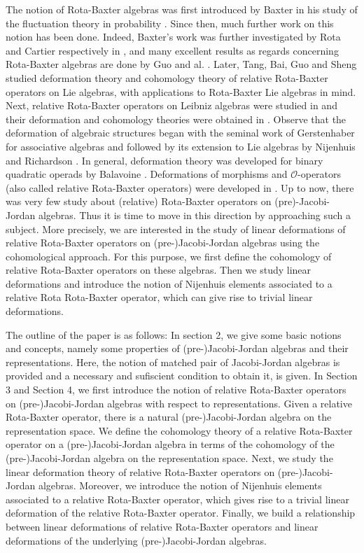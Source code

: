 \documentclass[12pt]{amsart}
\begin{document}
		The notion of Rota-Baxter algebras was first introduced by Baxter in his study of the fluctuation theory in
	probability \cite{gb}. Since then, much further work on this notion has been done. Indeed, Baxter's work was further investigated by Rota and Cartier respectively in \cite{gcr},\cite{pc} and many excellent results as regards concerning Rota-Baxter algebras are done by Guo
	and al. \cite{lg,lgwk,lgwk1}. Later, Tang, Bai, Guo and Sheng \cite{tbgs} studied deformation theory and cohomology theory of relative Rota-Baxter operators on Lie algebras, with applications to Rota-Baxter Lie algebras in mind. Next,  relative Rota-Baxter operators on Leibniz algebras were studied in \cite{ysr} and their deformation and cohomology theories were obtained in \cite{tsz}. Observe that the deformation of algebraic structures began with the seminal work of Gerstenhaber \cite{ger1,ger2} for associative algebras and followed by its extension to Lie algebras by Nijenhuis and Richardson \cite{nr1,nr2}. In general, deformation theory was developed for binary quadratic operads by Balavoine \cite{db}. Deformations of morphisms and $\mathcal{O}$-operators (also called relative Rota-Baxter operators) were developed in \cite{abm, das,fz1,fz2,tbgs}. 
	Up to now, there was very few study about (relative) Rota-Baxter operators  on (pre)-Jacobi-Jordan algebras.  Thus it is time  to move in this direction by approaching such a subject. More precisely, we are interested in the study of linear deformations of relative Rota-Baxter operators on (pre-)Jacobi-Jordan algebras using the cohomological approach. For this purpose, we first
	define the cohomology of relative Rota-Baxter operators on these algebras. Then we study
	linear deformations and introduce the notion of  Nijenhuis elements associated to a relative
	Rota Rota-Baxter operator, which can give rise to trivial linear deformations. 	
	
	The outline of the paper is as follows: In section 2, we give some basic notions and concepts, namely some properties of (pre-)Jacobi-Jordan algebras and their representations. Here, the notion of matched pair of Jacobi-Jordan algebras is provided and a necessary and sufiscient condition to obtain it, is given. 
	In Section 3 and Section 4, we first introduce the notion of relative Rota-Baxter operators on (pre-)Jacobi-Jordan algebras with respect to representations. Given a relative Rota-Baxter operator, there is a natural (pre-)Jacobi-Jordan algebra on the representation space. We define the cohomology theory of a relative Rota-Baxter operator on a (pre-)Jacobi-Jordan algebra in terms of the cohomology of the (pre-)Jacobi-Jordan algebra on the representation space. Next, we study the linear deformation theory of relative Rota-Baxter operators on (pre-)Jacobi-Jordan algebras. Moreover, we introduce the notion of  Nijenhuis elements associated to a relative Rota-Baxter operator, which gives rise to a trivial linear deformation of the relative Rota-Baxter operator. Finally, we  build a relationship between linear deformations of relative Rota-Baxter operators and linear deformations of the underlying (pre-)Jacobi-Jordan  algebras.
	
\end{document}
